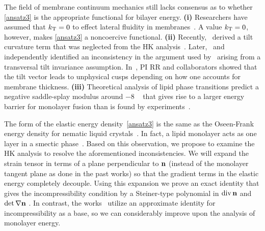 The field of membrane continuum mechanics still lacks consensus as to whether \eqref{ansatz3} is the appropriate functional for bilayer energy.
\textbf{(i)} Researchers have assumed that $k_{\mathrm{T}} = 0$ to effect lateral fluidity in
membranes~\cite{Hamm2000, TerziDeserno17, C9SM02079A,
PhysRevE.102.042406}. 
A value $k_{\mathrm{T}} = 0$, however, makes \eqref{ansatz3} a noncoercive functional.
\textbf{(ii)} Recently,~\cite{TerziDeserno17} derived a tilt curvature
term that was neglected from the HK analysis~\cite{Hamm2000}.
Later,~\cite{C9SM02079A} and~\cite{PhysRevE.102.042406} independently
identified an inconsistency in the argument used
by~\cite{TerziDeserno17} arising
from a transversal tilt invariance assumption.
In~\cite{RyKlYaCo16}, PI RR and collaborators showed that the tilt vector leads to unphysical cusps depending on how one accounts for membrane thickness.  
\textbf{(iii)} Theoretical analysis of lipid phase transitions predict a
negative saddle-splay modulus around $-8$ \kBT~\cite{SIEGEL2004366,
SIEGEL20085200} that gives rise to a larger energy barrier for
monolayer fusion than is found by experiments~\cite{FrRoPi17, Tran7106,
TerziDeserno17}.
%
%


The form of the elastic energy density~\eqref{ansatz3} is the same as
the Oseen-Frank energy density for nematic liquid
crystals~\cite{ANDRIENKO2018520, Tran7106, Helfrich73}. In fact, a lipid
monolayer acts as one layer in a smectic phase~\cite{REYESMATEO1995978,
Rangamani20140463, PhysRevLett.113.248102}. Based on this observation,
we propose to examine the HK analysis to resolve the aforementioned
inconsistencies. We will expand the strain tensor in terms of a plane
perpendicular to ${\bf n}$ (instead of the monolayer tangent plane as
done in the past works) so that the gradient terms in the elastic energy
completely decouple. Using this expansion we prove an exact identity
that gives the incompressibility condition by a Steiner-type polynomial
in $\operatorname{div} {\bf n}$ and $\det \nabla {\bf n}$ \cite{Fe59}. In contrast,
the works~\cite{TerziDeserno17, PhysRevE.102.042406, Hamm2000,
C9SM02079A} utilize an approximate identity for incompressibility as a base,
so we can considerably improve upon the analysis of monolayer energy.

